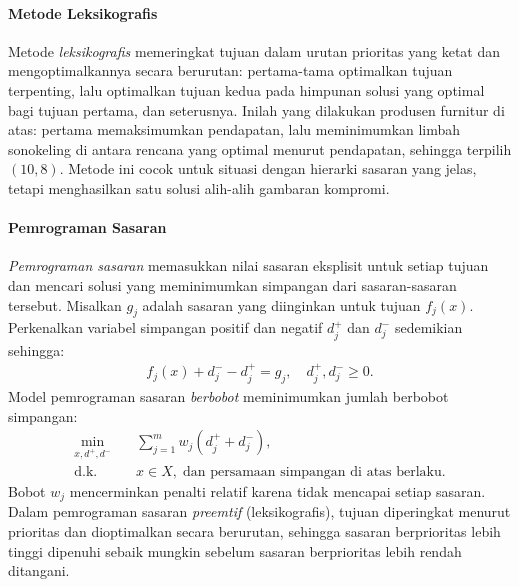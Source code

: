 \paragraph{Metode Leksikografis}
Metode \emph{leksikografis} memeringkat tujuan dalam urutan prioritas yang ketat dan mengoptimalkannya secara berurutan: pertama-tama optimalkan tujuan terpenting, lalu optimalkan tujuan kedua pada himpunan solusi yang optimal bagi tujuan pertama, dan seterusnya. Inilah yang dilakukan produsen furnitur di atas: pertama memaksimumkan pendapatan, lalu meminimumkan limbah sonokeling di antara rencana yang optimal menurut pendapatan, sehingga terpilih $(10,8)$. Metode ini cocok untuk situasi dengan hierarki sasaran yang jelas, tetapi menghasilkan satu solusi alih-alih gambaran kompromi.

\paragraph{Pemrograman Sasaran}
\emph{Pemrograman sasaran} memasukkan nilai sasaran eksplisit untuk setiap tujuan dan mencari solusi yang meminimumkan simpangan dari sasaran-sasaran tersebut. Misalkan $g_j$ adalah sasaran yang diinginkan untuk tujuan $f_j(x)$. Perkenalkan variabel simpangan positif dan negatif $d_j^+$ dan $d_j^-$ sedemikian sehingga:
\begin{align*}
f_j(x) + d_j^- - d_j^+ = g_j, \quad d_j^+, d_j^- \ge 0.
\end{align*}
Model pemrograman sasaran \emph{berbobot} meminimumkan jumlah berbobot simpangan:
\begin{align*}
\min_{x, d^+, d^-} \quad & \sum_{j=1}^m w_j (d_j^+ + d_j^-), \\
\text{d.k.} \quad & x \in X, \; \text{dan persamaan simpangan di atas berlaku.}
\end{align*}
Bobot $w_j$ mencerminkan penalti relatif karena tidak mencapai setiap sasaran.
Dalam pemrograman sasaran \emph{preemtif} (leksikografis), tujuan diperingkat menurut prioritas dan dioptimalkan secara berurutan, sehingga sasaran berprioritas lebih tinggi dipenuhi sebaik mungkin sebelum sasaran berprioritas lebih rendah ditangani.

